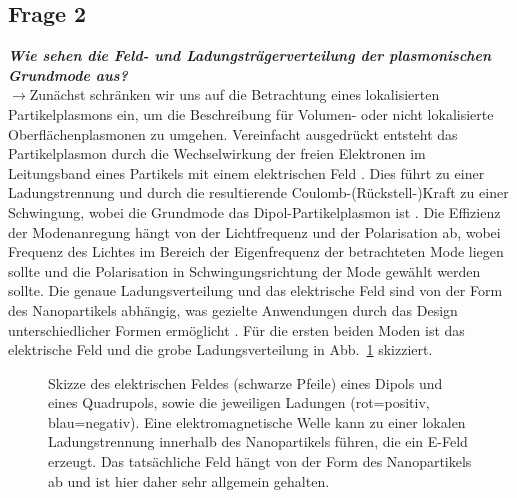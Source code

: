 \subsection{\label{subsec:FZV2}Frage 2}
\textbf{\textit{Wie sehen die Feld- und Ladungsträgerverteilung der plasmonischen Grundmode aus?}}\\
$\rightarrow$Zunächst schränken wir uns auf die Betrachtung eines lokalisierten Partikelplasmons 
ein, um die Beschreibung für Volumen- oder nicht lokalisierte Oberflächenplasmonen zu umgehen.
Vereinfacht ausgedrückt entsteht das Partikelplasmon durch die Wechselwirkung der freien Elektronen 
im Leitungsband eines Partikels mit einem elektrischen Feld \cite{Anleitung}. 
Dies führt zu einer Ladungstrennung und durch die resultierende Coulomb-(Rückstell-)Kraft zu einer Schwingung, 
wobei die Grundmode das Dipol-Partikelplasmon ist \cite{FZV2p3}. 
Die Effizienz der Modenanregung hängt von der Lichtfrequenz und der Polarisation ab, wobei 
Frequenz des Lichtes im Bereich der Eigenfrequenz der betrachteten Mode liegen sollte und 
die Polarisation in Schwingungsrichtung der Mode gewählt werden sollte. 
Die genaue Ladungsverteilung und das elektrische Feld sind von der Form des Nanopartikels abhängig, 
was gezielte Anwendungen durch das Design unterschiedlicher Formen ermöglicht \cite{FZV2p1}. 
Für die ersten beiden Moden ist das elektrische Feld und die grobe Ladungsverteilung 
in Abb.~\ref{fig:moden} skizziert.
\begin{figure}[h!]
    \centering
    \qquad
    \caption{\label{fig:moden}Skizze des elektrischen Feldes (schwarze Pfeile) eines 
    Dipols und eines Quadrupols, 
    sowie die jeweiligen Ladungen (rot=positiv, blau=negativ).
    Eine elektromagnetische Welle kann zu einer lokalen Ladungstrennung innerhalb des
    Nanopartikels führen, die ein E-Feld erzeugt. Das tatsächliche Feld 
    hängt von der Form des Nanopartikels ab und ist hier daher sehr allgemein gehalten.}
\end{figure}\FloatBarrier \,\\

